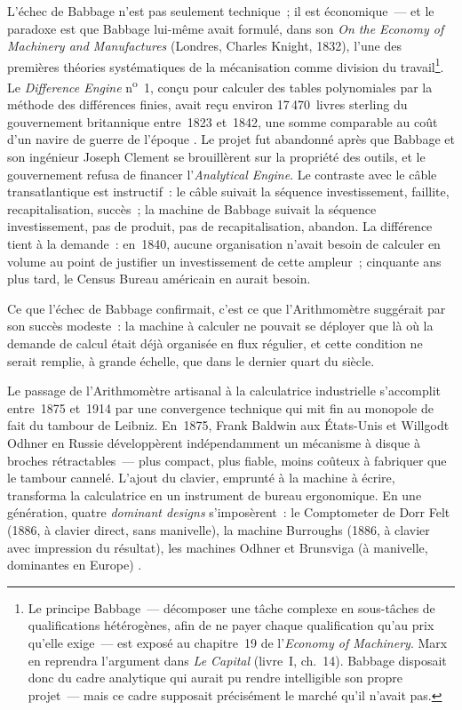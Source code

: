 %
L'échec de Babbage n'est pas seulement technique~; il est économique~--- et le paradoxe est que Babbage lui-même avait formulé, dans son \emph{On the Economy of Machinery and Manufactures} (Londres, Charles Knight, 1832), l'une des premières théories systématiques de la mécanisation comme division du travail\footnote{Le \og principe Babbage\fg{}~--- décomposer une tâche complexe en sous-tâches de qualifications hétérogènes, afin de ne payer chaque qualification qu'au prix qu'elle exige~--- est exposé au chapitre~19 de l'\emph{Economy of Machinery}. Marx en reprendra l'argument dans \emph{Le Capital} (livre~I, ch.~14). Babbage disposait donc du cadre analytique qui aurait pu rendre intelligible son propre projet~--- mais ce cadre supposait précisément le marché qu'il n'avait pas.}. Le \emph{Difference Engine} n\textsuperscript{o}~1, conçu pour calculer des tables polynomiales par la méthode des différences finies, avait reçu environ 17\,470~livres sterling du gouvernement britannique entre~1823 et~1842, une somme comparable au coût d'un navire de guerre de l'époque \parencite{swade_difference_2001}. Le projet fut abandonné après que Babbage et son ingénieur Joseph Clement se brouillèrent sur la propriété des outils, et le gouvernement refusa de financer l'\emph{Analytical Engine}. Le contraste avec le câble transatlantique est instructif~: le câble suivait la séquence investissement, faillite, recapitalisation, succès~; la machine de Babbage suivait la séquence investissement, pas de produit, pas de recapitalisation, abandon. La différence tient à la demande~: en~1840, aucune organisation n'avait besoin de calculer en volume au point de justifier un investissement de cette ampleur~; cinquante ans plus tard, le Census Bureau américain en aurait besoin.

Ce que l'échec de Babbage confirmait, c'est ce que l'Arithmomètre suggérait par son succès modeste~: la machine à calculer ne pouvait se déployer que là où la demande de calcul était déjà organisée en flux régulier, et cette condition ne serait remplie, à grande échelle, que dans le dernier quart du siècle.

Le passage de l'Arithmomètre artisanal à la calculatrice industrielle s'accomplit entre~1875 et~1914 par une convergence technique qui mit fin au monopole de fait du tambour de Leibniz. En~1875, Frank Baldwin aux États-Unis et Willgodt Odhner en Russie développèrent indépendamment un mécanisme à disque à broches rétractables~--- plus compact, plus fiable, moins coûteux à fabriquer que le tambour cannelé. L'ajout du clavier, emprunté à la machine à écrire, transforma la calculatrice en un instrument de bureau ergonomique. En une génération, quatre \emph{dominant designs} s'imposèrent~: le Comptometer de Dorr Felt (1886, à clavier direct, sans manivelle), la machine Burroughs (1886, à clavier avec impression du résultat), les machines Odhner et Brunsviga (à manivelle, dominantes en Europe) \parencite{cortada_before_1993}.


